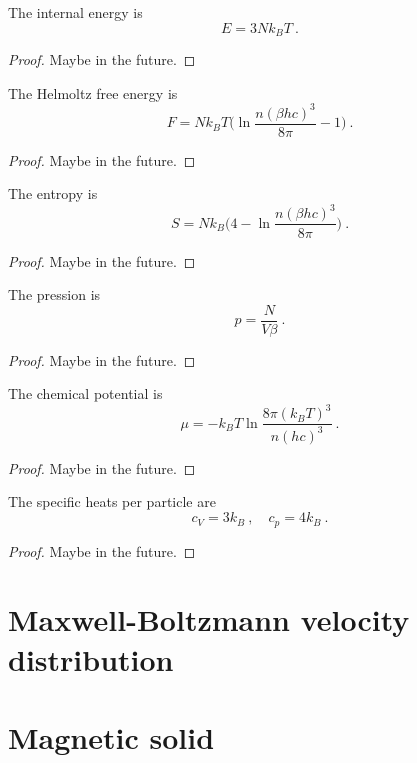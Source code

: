     The internal energy is 
    \begin{equation*}
        E = 3 N k_B T ~.
    \end{equation*}
    \begin{proof}
        Maybe in the future.
    \end{proof}
    
    The Helmoltz free energy is 
    \begin{equation*}
        F = N k_B T \Big (\ln \frac{n (\beta h c)^3}{8 \pi} - 1 \Big )~.
    \end{equation*}
    \begin{proof}
        Maybe in the future.
    \end{proof}
    
    The entropy is 
    \begin{equation*}
        S = N k_B \Big (4 - \ln \frac{n (\beta h c)^3}{8 \pi} \Big) ~.
    \end{equation*}
    \begin{proof}
        Maybe in the future.
    \end{proof}
    
    The pression is 
    \begin{equation*}
        p = \frac{N}{V\beta} ~.
    \end{equation*}
    \begin{proof}
        Maybe in the future.
    \end{proof}
    
    The chemical potential is 
    \begin{equation*}
        \mu = - k_B T \ln \frac{8 \pi (k_B T)^3}{n (hc)^3} ~.
    \end{equation*}
    \begin{proof}
        Maybe in the future.
    \end{proof}

    The specific heats per particle are 
    \begin{equation*}
        c_V = 3 k_B ~, \quad c_p = 4 k_B ~. 
    \end{equation*}
    \begin{proof}
        Maybe in the future.
    \end{proof}

\section{Maxwell-Boltzmann velocity distribution}

\section{Magnetic solid}

